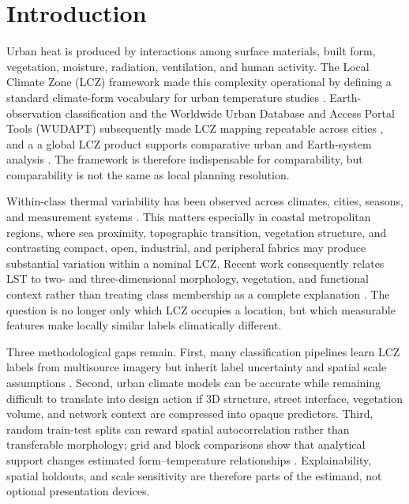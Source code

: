 \section{Introduction}\label{sec:introduction}

Urban heat is produced by interactions among surface materials, built form,
vegetation, moisture, radiation, ventilation, and human activity. The Local
Climate Zone (LCZ) framework made this complexity operational by defining a
standard climate-form vocabulary for urban temperature studies
\citep{stewart2012LocalClimate}. Earth-observation classification and the
Worldwide Urban Database and Access Portal Tools (WUDAPT) subsequently made
LCZ mapping repeatable across cities \citep{bechtel2012ClassifiLocal,
bechtel2015MappingLocal,ching2018WudaptUrban,bechtel2019GeneratiWudapt}, and a
a global LCZ product supports comparative urban and Earth-system analysis
\citep{demuzere2022GlobalLocal}. The framework is therefore indispensable for
comparability, but comparability is not the same as local planning resolution.

Within-class thermal variability has been observed across climates, cities,
seasons, and measurement systems \citep{geletic2016LandSurface,
skarbit2017EmployinUrban,kwok2019WellDoes,yang2020InvestigDiversit,
li2022VariabilLand}. This matters especially in coastal metropolitan regions,
where sea proximity, topographic transition, vegetation structure, and
contrasting compact, open, industrial, and peripheral fabrics may produce
substantial variation within a nominal LCZ. Recent work consequently relates
LST to two- and three-dimensional morphology, vegetation, and functional
context rather than treating class membership as a complete explanation
\citep{zhou2022UnderstaEffects,wang2023EffectivFactors,
zhou2023IdentifyEffects,liu2025UnveilinDifferen,yu2026UrbanMorpholo}. The
question is no longer only which LCZ occupies a location, but which measurable
features make locally similar labels climatically different.

Three methodological gaps remain. First, many classification pipelines learn
LCZ labels from multisource imagery but inherit label uncertainty and spatial
scale assumptions \citep{qiu2018FeatureImportan,yoo2019ComparisBetween,
qiu2020MultilevFeature,yoo2020ImprovinLocal,yan2022ComparinObject}. Second,
urban climate models can be accurate while remaining difficult to translate
into design action if 3D structure, street interface, vegetation volume, and
network context are compressed into opaque predictors. Third, random train-test
splits can reward spatial autocorrelation rather than transferable morphology;
grid and block comparisons show that analytical support changes estimated
form--temperature relationships \citep{jeon2023ImpactsUrban,wu2022ScaleEffect,
li2026InvestigEffect}. Explainability, spatial holdouts, and scale sensitivity
are therefore parts of the estimand, not optional presentation devices.

